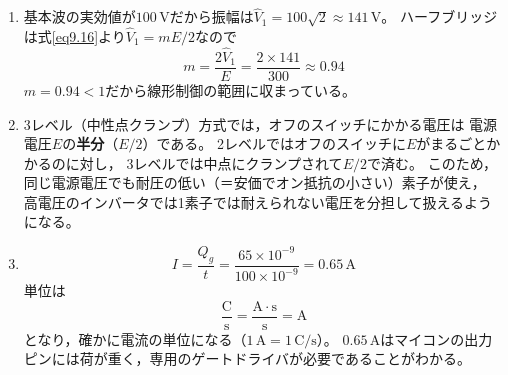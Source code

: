\begin{enumerate}
\item[9.5節 問5]
基本波の実効値が$100$\,Vだから振幅は$\hat{V}_1 = 100\sqrt{2} \approx 141$\,V。
ハーフブリッジは式\ref{eq9.16}より$\hat{V}_1 = mE/2$なので
\begin{equation*}
m = \frac{2\hat{V}_1}{E} = \frac{2 \times 141}{300} \approx 0.94
\end{equation*}
$m = 0.94 < 1$だから線形制御の範囲に収まっている。

\item[9.6節 問6]
3レベル（中性点クランプ）方式では，オフのスイッチにかかる電圧は
電源電圧$E$の\textbf{半分}（$E/2$）である。
2レベルではオフのスイッチに$E$がまるごとかかるのに対し，
3レベルでは中点にクランプされて$E/2$で済む。
このため，同じ電源電圧でも耐圧の低い（＝安価でオン抵抗の小さい）素子が使え，
高電圧のインバータでは1素子では耐えられない電圧を分担して扱えるようになる。

\item[9.7節 問7]
\begin{equation*}
I = \frac{Q_g}{t} = \frac{65\times10^{-9}}{100\times10^{-9}} = 0.65\,\mathrm{A}
\end{equation*}
単位は
\begin{equation*}
\frac{\mathrm{C}}{\mathrm{s}} = \frac{\mathrm{A\cdot s}}{\mathrm{s}} = \mathrm{A}
\end{equation*}
となり，確かに電流の単位になる（$1\,\mathrm{A} = 1\,\mathrm{C/s}$）。
$0.65$\,Aはマイコンの出力ピンには荷が重く，専用のゲートドライバが必要であることがわかる。

\end{enumerate}
